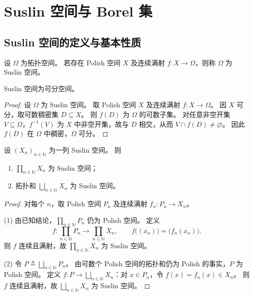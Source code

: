 \documentclass[lang=cn,a4paper,newtx,figureplace=section,tableplace=section]{elegantbook}
\begin{document}
\section{Suslin 空间与 Borel 集}

\subsection{Suslin 空间的定义与基本性质}

\begin{definition}[Suslin 空间]
  设 $\Omega$ 为拓扑空间。
  若存在 Polish 空间 $X$ 及连续满射 $f:X\to\Omega$，则称 $\Omega$ 为 Suslin 空间。
\end{definition}

\begin{remark}
  Suslin 空间为可分空间。
\end{remark}

\begin{proof}
  设 $\Omega$ 为 Suslin 空间。
  取 Polish 空间 $X$ 及连续满射 $f:X\to\Omega$。
  因 $X$ 可分，取可数稠密集 $D\subseteq X$。
  则 $f(D)$ 为 $\Omega$ 的可数子集。
  对任意非空开集 $V\subseteq\Omega$，$f^{-1}(V)$ 为 $X$ 中非空开集，故与 $D$ 相交，从而 $V\cap f(D)\ne\varnothing$。
  因此 $f(D)$ 在 $\Omega$ 中稠密，$\Omega$ 可分。
\end{proof}

\begin{theorem}\label{thm:suslin-product-coproduct}
  设 $(X_n)_{n\in\mathbb{N}}$ 为一列 Suslin 空间。
  则
  \begin{enumerate}
    \item $\prod_{n\in\mathbb{N}}X_n$ 为 Suslin 空间；
    \item 拓扑和 $\bigsqcup_{n\in\mathbb{N}}X_n$ 为 Suslin 空间。
  \end{enumerate}
\end{theorem}
\begin{proof}
  对每个 $n$，取 Polish 空间 $P_n$ 及连续满射 $f_n:P_n\to X_n$。

  (1) 由已知结论，$\prod_{n\in\mathbb{N}}P_n$ 仍为 Polish 空间。
  定义
  \[
    f:\prod_{n\in\mathbb{N}}P_n\to\prod_{n\in\mathbb{N}}X_n,\qquad f\bigl((x_n)\bigr)=\bigl(f_n(x_n)\bigr).
  \]
  则 $f$ 连续且满射，故 $\prod_{n\in\mathbb{N}}X_n$ 为 Suslin 空间。

  (2) 令 $P\triangleq\bigsqcup_{n\in\mathbb{N}}P_n$。
  由可数个 Polish 空间的拓扑和仍为 Polish 的事实，$P$ 为 Polish 空间。
  定义 $f:P\to\bigsqcup_{n\in\mathbb{N}}X_n$：对 $x\in P_n$，令 $f(x)=f_n(x)\in X_n$。
  则 $f$ 连续且满射，故 $\bigsqcup_{n\in\mathbb{N}}X_n$ 为 Suslin 空间。
\end{proof}
\end{document}
